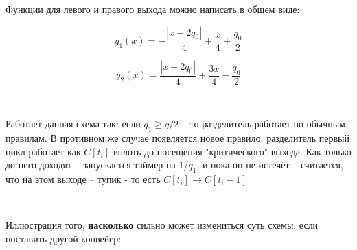 \vspace{0.5in}

\noindent Функции для левого и правого выхода можно написать в общем виде:

$$
y_1(x) = -\frac{|x-2q_0|}{4} + \frac{x}{4} + \frac{q_0}{2} 
$$

$$
y_2(x) = \frac{|x-2q_0|}{4} + \frac{3x}{4} - \frac{q_0}{2}
$$

\

Работает данная схема так: если $q_1 \ge q/2$ -- то разделитель работает по обычным правилам. В противном же случае появляется новое правило: разделитель первый цикл работает как $C[t_i]$ вплоть до посещения "критического" выхода. Как только до него доходят -- запускается таймер на $1/q_1$, и пока он не истечёт -- считается, что на этом выходе -- тупик - то есть $C[t_i] \to C[t_i-1]$

\

\noindent Иллюстрация того, \textbf{насколько} сильно может измениться суть схемы, если поставить другой конвейер:




\vspace{0.5in}

